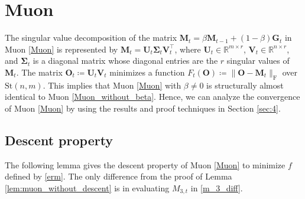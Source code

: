 \documentclass[twoside,11pt]{article}
\begin{document}
\section{Muon}
\label{sec:5}
The singular value decomposition of the matrix $\bm{M}_t = \beta \bm{M}_{t-1} + (1 - \beta) \bm{G}_t$ in Muon \eqref{Muon} is represented by $\bm{M}_t = \bm{U}_t \bm{\Sigma}_t \bm{V}_t^\top$, where $\bm{U}_t \in \mathbb{R}^{m \times r}$, $\bm{V}_t \in \mathbb{R}^{n \times r}$, and $\bm{\Sigma}_t$ is a diagonal matrix whose diagonal entries are the $r$ singular values of $\bm{M}_t$. The matrix $\bm{O}_t \coloneqq \bm{U}_t \bm{V}_t$ minimizes a function $F_t (\bm{O}) \coloneqq \|\bm{O} - \bm{M}_t \|_{\mathrm{F}}$ over $\mathrm{St}(n,m)$. This implies that Muon \eqref{Muon} with $\beta \neq 0$ is structurally almost identical to Muon \eqref{Muon_without_beta}. Hence, we can analyze the convergence of Muon \eqref{Muon} by using the results and proof techniques in Section \ref{sec:4}.

\subsection{Descent property}
The following lemma gives the descent property of Muon \eqref{Muon} to minimize $f$ defined by \eqref{erm}. The only difference from the proof of Lemma \ref{lem:muon_without_descent} is in evaluating $M_{3,t}$ in \eqref{m_3_diff}.
\end{document}
